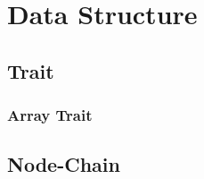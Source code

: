 
\section{Data Structure}

\subsection{Trait}

\subsubsection{Array Trait}

\subsection{Node-Chain}



